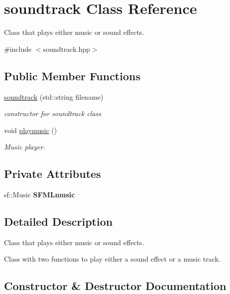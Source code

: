 \hypertarget{classsoundtrack}{}\section{soundtrack Class Reference}
\label{classsoundtrack}


Class that plays either music or sound effects.  




{\ttfamily \#include $<$soundtrack.\+hpp$>$}

\subsection*{Public Member Functions}
\begin{DoxyCompactItemize}
\item 
\hyperlink{classsoundtrack_add31bdeb1a693d541443f1d88586d3b6}{soundtrack} (std\+::string filename)
\begin{DoxyCompactList}\small\item\em constructor for soundtrack class \end{DoxyCompactList}\item 
void \hyperlink{classsoundtrack_a7569a4c0cde86548197756b8e05cf464}{playmusic} ()
\begin{DoxyCompactList}\small\item\em Music player. \end{DoxyCompactList}\end{DoxyCompactItemize}
\subsection*{Private Attributes}
\begin{DoxyCompactItemize}
\item 
\mbox{\label{classsoundtrack_ae1db63c6fe8c2f2111c693bd543e921c}} 
sf\+::\+Music {\bfseries S\+F\+M\+Lmusic}
\end{DoxyCompactItemize}


\subsection{Detailed Description}
Class that plays either music or sound effects. 

Class with two functions to play either a sound effect or a music track. 

\subsection{Constructor \& Destructor Documentation}
\mbox{\label{classsoundtrack_add31bdeb1a693d541443f1d88586d3b6}} 
